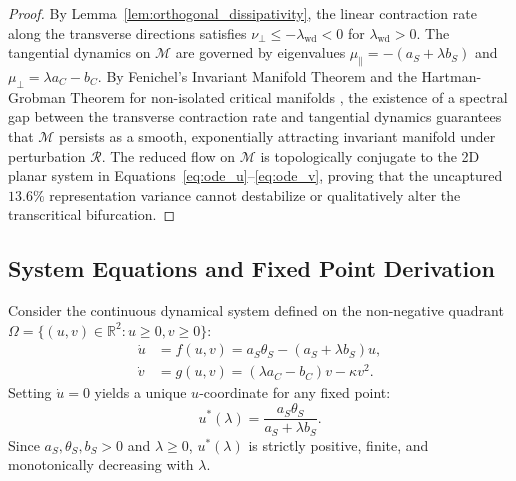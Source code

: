 \documentclass{article}
\theoremstyle{plain}
\theoremstyle{definition}
\begin{document}
\begin{proof}
By Lemma~\ref{lem:orthogonal_dissipativity}, the linear contraction rate along the transverse directions satisfies $\nu_\perp \le -\lambda_{\text{wd}} < 0$ for $\lambda_{\text{wd}} > 0$. The tangential dynamics on $\mathcal{M}$ are governed by eigenvalues $\mu_\parallel = -(a_S + \lambda b_S)$ and $\mu_\perp = \lambda a_C - b_C$.
By Fenichel's Invariant Manifold Theorem and the Hartman-Grobman Theorem for non-isolated critical manifolds \citep{Fenichel1979Geometric,Wiggins2003Introduction}, the existence of a spectral gap between the transverse contraction rate and tangential dynamics guarantees that $\mathcal{M}$ persists as a smooth, exponentially attracting invariant manifold under perturbation $\mathcal{R}$.
The reduced flow on $\mathcal{M}$ is topologically conjugate to the 2D planar system in Equations~\eqref{eq:ode_u}--\eqref{eq:ode_v}, proving that the uncaptured $13.6\%$ representation variance cannot destabilize or qualitatively alter the transcritical bifurcation.
\end{proof}

\subsection{System Equations and Fixed Point Derivation}
Consider the continuous dynamical system defined on the non-negative quadrant $\Omega = \{ (u, v) \in \mathbb{R}^2 : u \ge 0, v \ge 0 \}$:
\begin{align}
    \dot{u} &= f(u, v) = a_S \theta_S - (a_S + \lambda b_S) u, \label{eq:app_u} \\
    \dot{v} &= g(u, v) = (\lambda a_C - b_C) v - \kappa v^2. \label{eq:app_v}
\end{align}
Setting $\dot{u} = 0$ yields a unique $u$-coordinate for any fixed point:
\begin{equation}
    u^*(\lambda) = \frac{a_S \theta_S}{a_S + \lambda b_S}.
\end{equation}
Since $a_S, \theta_S, b_S > 0$ and $\lambda \ge 0$, $u^*(\lambda)$ is strictly positive, finite, and monotonically decreasing with $\lambda$.
\end{document}
